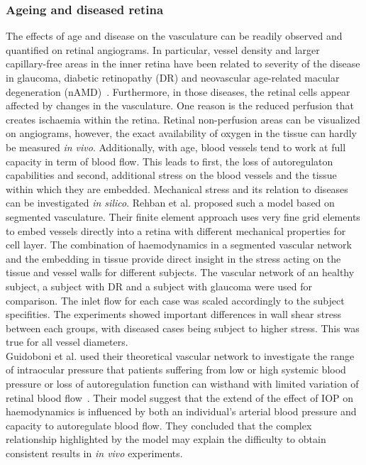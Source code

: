 \documentclass[12pt,a4paper]{article}
\begin{document}
\break

\subsubsection{Ageing and diseased retina}

The effects of age and disease on the vasculature can be readily observed and quantified on retinal angiograms.
In particular, vessel density and larger capillary-free areas in the inner retina have been related to severity of the disease in glaucoma, diabetic retinopathy (DR) and neovascular age-related macular degeneration (nAMD)~\cite{Al_Sheikh_2016, Rao_2020, Yuan_2020}.
Furthermore, in those diseases, the retinal cells appear affected by changes in the vasculature.
One reason is the reduced perfusion that creates ischaemia within the retina.
Retinal non-perfusion areas can be visualized on angiograms, however, the exact availability of oxygen in the tissue can hardly be measured \textit{in vivo}.
Additionally, with age, blood vessels tend to work at full capacity in term of blood flow.
This leads to first, the loss of autoregulaton capabilities and second, additional stress on the blood vessels and the tissue within which they are embedded.
Mechanical stress and its relation to diseases can be investigated \textit{in silico}.
Rehban et al. proposed such a model based on segmented vasculature.
Their finite element approach uses very fine grid elements to embed vessels directly into a retina with different mechanical properties for cell layer.
The combination of haemodynamics in a segmented vascular network and the embedding in tissue provide direct insight in the stress acting on the tissue and vessel walls for different subjects.
The vascular network of an healthy subject, a subject with DR and a subject with glaucoma were used for comparison.
The inlet flow for each case was scaled accordingly to the subject specifities.
The experiments showed important differences in wall shear stress between each groups, with diseased cases being subject to higher stress.
This was true for all vessel diameters.\\
Guidoboni et al. used their theoretical vascular network to investigate the range of intraocular pressure that patients suffering from low or high systemic blood pressure or loss of autoregulation function can wisthand with limited variation of retinal blood flow~\cite{Guidoboni_2014b}.
Their model suggest that the extend of the effect of IOP on haemodynamics is influenced by both an individual's arterial blood pressure and capacity to autoregulate blood flow.
They concluded that the complex relationship highlighted by the model may explain the difficulty to obtain consistent results in \textit{in vivo} experiments.
\end{document}
